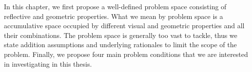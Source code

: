 In this chapter, we first propose a well-defined problem space consisting of reflective and geometric properties. What we mean by problem space is a accumulative space occupied by different visual and geometric properties and all their combinations. The problem space is generally too vast to tackle, thus we state addition assumptions and underlying rationales to limit the scope of the problem. Finally, we propose four main problem conditions that we are interested in investigating in this thesis.



